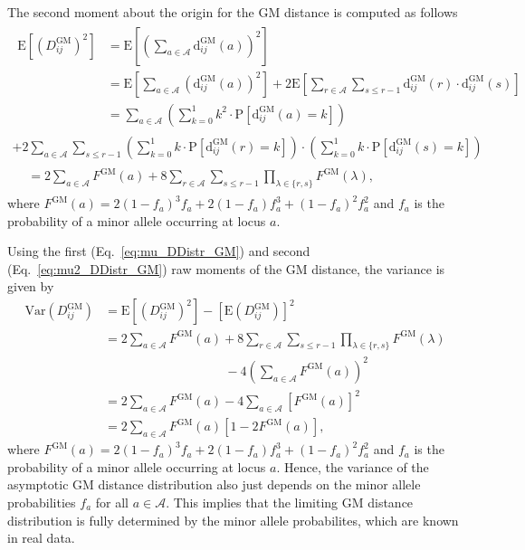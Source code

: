 \documentclass[aoas]{imsart}
\begin{document}
The second moment about the origin for the GM distance is computed as follows
%
\begin{equation}\label{eq:mu2_DDistr_GM}
\begin{split}
\begin{aligned}
\text{E}\left[\left(D^\text{GM}_{ij}\right)^2\right] &= \text{E}\left[\left(\sum_{a \in \mathcal{A}} \text{d}^\text{GM}_{ij}(a)\right)^2\right] \\
&= \text{E}\left[\sum_{a \in \mathcal{A}} \left(\text{d}^\text{GM}_{ij}(a)\right)^2\right] + 2 \text{E}\left[\sum_{r \in \mathcal{A}} \sum_{s \leq r - 1} \text{d}^\text{GM}_{ij}(r) \cdot \text{d}^\text{GM}_{ij}(s)\right] \\
&= \sum_{a \in \mathcal{A}} \left(\sum_{k = 0}^{1} k^2 \cdot \text{P}\left[\text{d}^\text{GM}_{ij}(a) = k\right]\right)
\end{aligned}\\
+ 2\sum_{a \in \mathcal{A}} \sum_{s \leq r - 1} \left(\sum_{k = 0}^{1} k \cdot \text{P}\left[\text{d}^\text{GM}_{ij}(r) = k\right]\right) \cdot \left(\sum_{k = 0}^{1} k \cdot \text{P}\left[\text{d}^\text{GM}_{ij}(s) = k\right]\right) \\
\begin{aligned}
&= 2\sum_{a \in \mathcal{A}} F^\text{GM}(a) + 8 \sum_{r \in \mathcal{A}} \sum_{s \leq r - 1} \prod_{\lambda \in \{r,s\}} F^\text{GM}(\lambda),
\end{aligned}
\end{split}
\end{equation}
%
where $F^\text{GM}(a) = 2(1 - f_a)^3f_a + 2(1 - f_a)f^3_a + (1 - f_a)^2f^2_a$ and $f_a$ is the probability of a minor allele occurring at locus $a$.

Using the first (Eq.~\ref{eq:mu_DDistr_GM}) and second (Eq.~\ref{eq:mu2_DDistr_GM}) raw moments of the GM distance, the variance is given by
%
\begin{equation}\label{eq:var_DDistr_GM}
\begin{aligned}
\text{Var}\left(D^\text{GM}_{ij}\right) &= \text{E}\left[\left(D^\text{GM}_{ij}\right)^2\right] - \left[\text{E}\left(D^\text{GM}_{ij}\right)\right]^2 \\
&= 2\sum_{a \in \mathcal{A}} F^\text{GM}(a) + 8\sum_{r \in \mathcal{A}} \sum_{s \leq r - 1} \prod_{\lambda \in \{r,s\}} F^\text{GM}(\lambda) \\
&\hspace{4cm}- 4\left(\sum_{a \in \mathcal{A}}F^\text{GM}(a)\right)^2 \\
&= 2\sum_{a \in \mathcal{A}} F^\text{GM}(a) - 4\sum_{a \in \mathcal{A}}\left[F^\text{GM}(a)\right]^2 \\
&= 2\sum_{a \in \mathcal{A}} F^\text{GM}(a)[1 - 2F^\text{GM}(a)],
\end{aligned}
\end{equation}
%
where $F^\text{GM}(a) = 2(1 - f_a)^3f_a + 2(1 - f_a)f^3_a + (1 - f_a)^2f^2_a$ and $f_a$ is the probability of a minor allele occurring at locus $a$. Hence, the variance of the asymptotic GM distance distribution also just depends on the minor allele probabilities $f_a$ for all $a \in \mathcal{A}$. This implies that the limiting GM distance distribution is fully determined by the minor allele probabilites, which are known in real data.
\end{document}
